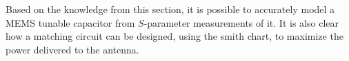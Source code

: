 \begin{aautail}
    Based on the knowledge from this section, it is possible to accurately model a MEMS tunable capacitor from $S$-parameter measurements of it. It is also clear how a matching circuit can be designed, using the smith chart, to maximize the power delivered to the antenna.

\end{aautail}
